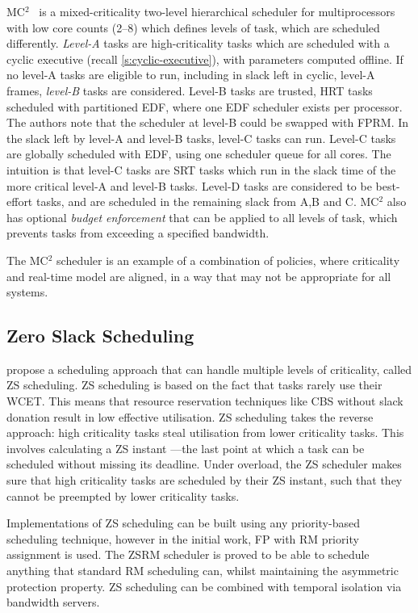 MC$^2$~\citep{Herman_KMAJ_12} is a mixed-criticality two-level hierarchical scheduler 
for multiprocessors with low core counts (2--8) which defines levels of task, which are scheduled differently.
\emph{Level-A} tasks are high-criticality tasks which are scheduled with a cyclic executive (recall
\cref{s:cyclic-executive}), with parameters computed offline. If no level-A tasks are eligible to
run, including in slack left in cyclic, level-A frames, \emph{level-B} tasks are considered. Level-B
tasks are trusted, \gls{HRT} tasks scheduled with partitioned \gls{EDF}, where one \gls{EDF}
scheduler exists per processor.
The authors note that the scheduler at level-B could be swapped with \gls{FPRM}.
In the slack left by level-A and level-B tasks, level-C tasks can run. Level-C tasks are globally
scheduled with \gls{EDF}, using one scheduler queue for all cores. The intuition is that level-C
tasks are \gls{SRT} tasks which run in the slack time of the more critical level-A and level-B
tasks. Level-D tasks are considered to be best-effort tasks, and are scheduled in the remaining
slack from A,B and C. MC$^2$ also has optional \emph{budget enforcement} that can be applied to all
levels of task, which prevents tasks from exceeding a specified bandwidth. 

The MC$^2$ scheduler is an example of a combination of policies, where criticality and real-time
model are aligned, in a way that may not be appropriate for all systems.

\subsection{Zero Slack Scheduling}
\label{s:zero-slack-scheduling}

 propose a scheduling approach that can handle multiple levels of criticality,
called \gls{ZS} scheduling. \gls{ZS} scheduling is based on the fact that tasks rarely use their
\gls{WCET}.  This means that resource reservation techniques like \gls{CBS} without slack donation
result in low effective utilisation.  ZS scheduling takes the reverse approach: high criticality
tasks steal utilisation from lower criticality tasks.  This involves calculating a \gls{ZS} instant
---the last point at which a task can be scheduled without missing its deadline.  Under overload, the
\gls{ZS} scheduler makes sure that high criticality tasks are scheduled by their \gls{ZS} instant,
such that they cannot be preempted by lower criticality tasks.

Implementations of \gls{ZS} scheduling can be built using any priority-based scheduling technique,
however in the initial work, \gls{FP} with \gls{RM} priority assignment is used.  The
\gls{ZS}\gls{RM} scheduler is proved to be able to schedule anything that standard \gls{RM}
scheduling can, whilst maintaining the asymmetric protection property.  \gls{ZS} scheduling can be
combined with temporal isolation via bandwidth servers.

